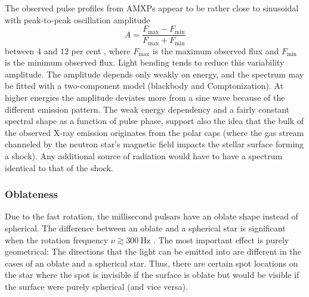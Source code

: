 \documentclass{wihuri}
\def\be{\begin{equation}}
\def\ee{\end{equation}}
\begin{document}
The observed pulse profiles from AMXPs appear to be rather close to sinusoidal with peak-to-peak oscillation amplitude 
\be \label{eq:amplitude}
A = \frac{F_{\mathrm{max}} - F_{\mathrm{min}}} {F_{\mathrm{max}} + F_{\mathrm{min}}}
\ee %
 between $4$ and $12$ per cent \cite{poutarew2006}, where $F_{\mathrm{max}}$ is the maximum observed flux and $F_{\mathrm{min}}$ is the minimum observed flux. Light bending tends %
to reduce this variability amplitude. The amplitude depends only weakly on energy, and the spectrum may be fitted with a two-component model (blackbody and Comptonization). At higher energies the amplitude deviates more from a sine wave because of the different emission pattern. The weak energy dependency and a fairly constant spectral shape as a function of pulse phase, support also the idea that the bulk of the observed X-ray emission originates from the polar caps (where the gas stream channeled by the neutron star's magnetic field impacts the stellar surface forming a shock). Any additional source of radiation would have to have a spectrum identical to that of the shock.


\subsubsection{Oblateness}

Due to the fast rotation, the millisecond pulsars have an oblate shape instead of spherical. The difference between an oblate and a spherical star is significant when the rotation frequency $\nu \gtrsim 300 ~\mathrm{Hz}$ \cite{cadeau}%
. The most important effect is purely geometrical: The directions that the light can be emitted into are different in the cases of an oblate and a spherical star. Thus, there are certain spot locations on the star where the spot is invisible if the surface is oblate but would be visible if the surface were purely spherical (and vice versa).
\end{document}
